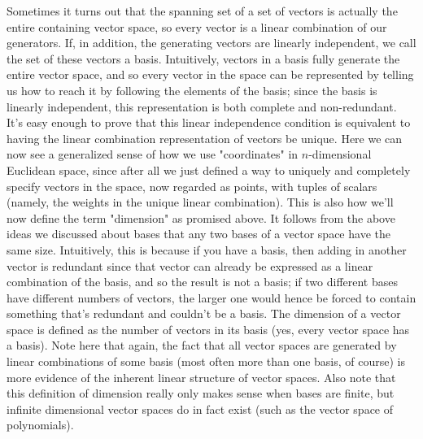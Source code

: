 \documentclass{article}
\newcommand{\nn}{\leavevmode \newline \newline}
\begin{document}
Sometimes it turns out that the spanning set of a set of vectors is actually the entire containing vector space, so every vector is a linear combination of our generators. If, in addition, the generating vectors are linearly independent, we call the set of these vectors a basis. Intuitively, vectors in a basis fully generate the entire vector space, and so every vector in the space can be represented by telling us how to reach it by following the elements of the basis; since the basis is linearly independent, this representation is both complete and non-redundant. It's easy enough to prove that this linear independence condition is equivalent to having the linear combination representation of vectors be unique. Here we can now see a generalized sense of how we use "coordinates" in $ n $-dimensional Euclidean space, since after all we just defined a way to uniquely and completely specify vectors in the space, now regarded as points, with tuples of scalars (namely, the weights in the unique linear combination). This is also how we'll now define the term "dimension" as promised above. It follows from the above ideas we discussed about bases that any two bases of a vector space have the same size. Intuitively, this is because if you have a basis, then adding in another vector is redundant since that vector can already be expressed as a linear combination of the basis, and so the result is not a basis; if two different bases have different numbers of vectors, the larger one would hence be forced to contain something that's redundant and couldn't be a basis. The dimension of a vector space is defined as the number of vectors in its basis (yes, every vector space has a basis).
\nn
Note here that again, the fact that all vector spaces are generated by linear combinations of some basis (most often more than one basis, of course) is more evidence of the inherent linear structure of vector spaces. Also note that this definition of dimension really only makes sense when bases are finite, but infinite dimensional vector spaces do in fact exist (such as the vector space of polynomials).
\nn
\end{document}
